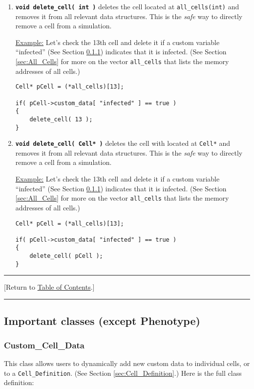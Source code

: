 \documentclass[12pt]{article}
\renewcommand{\v}{\verb}
\newcommand{\smallcode}[1]{\textbf{\texttt{#1}}}
\newcommand{\TOClink}{\begin{center}\hrule\vskip-5pt\phantom{.}\hfill[Return to \hyperlink{TOC}{Table of Contents}.]\hfill\phantom{.}\vskip3pt\hrule\end{center}}
\begin{document}
\begin{enumerate}
\item 
\smallcode{void delete\_cell( int )} deletes the cell 
located at \v|all_cells(int)| and removes it from 
all relevant data structures.  
This is the \emph{safe} way to directly remove a cell 
from a simulation. 

\underline{Example:} Let's check the 13th cell and delete it 
if a custom variable ``infected'' (See Section \ref{sec:Custom_Cell_Data}) indicates that 
 it is infected. (See Section \ref{sec:All_Cells} for more 
on the vector \v|all_cells| that lists the memory addresses of all cells.)
 
\begin{verbatim}
Cell* pCell = (*all_cells)[13]; 

if( pCell->custom_data[ "infected" ] == true )
{
    delete_cell( 13 ); 
}
\end{verbatim}

\item 
\smallcode{void delete\_cell( Cell* )} deletes the cell 
with located at \v|Cell*| and removes it from 
all relevant data structures.  
This is the \emph{safe} way to directly remove a cell 
from a simulation. 

\underline{Example:} Let's check the 13th cell  and delete it 
if a custom variable ``infected'' (See Section \ref{sec:Custom_Cell_Data}) indicates that 
 it is infected. (See Section \ref{sec:All_Cells} for more 
on the vector \v|all_cells| that lists the memory addresses of all cells.)
 
\begin{verbatim}
Cell* pCell = (*all_cells)[13]; 

if( pCell->custom_data[ "infected" ] == true )
{
    delete_cell( pCell ); 
}
\end{verbatim}
\end{enumerate}
 

\TOClink 

\subsection{Important classes (except Phenotype)}

\subsubsection{Custom\_Cell\_Data}
\label{sec:Custom_Cell_Data}
This class allows users to dynamically add new custom data to 
individual cells, or to a \v|Cell_Definition|. (See Section 
\ref{sec:Cell_Definition}.) Here is the full class definition: 
\end{document}
